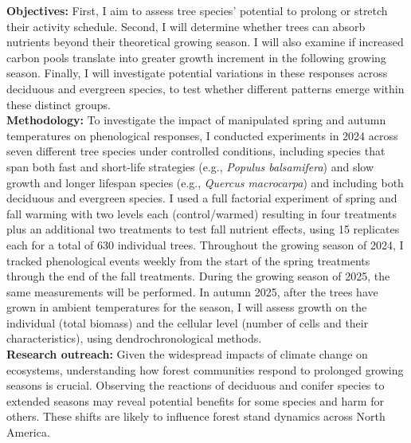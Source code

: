 \documentclass{article}
\begin{document}
\textbf {Objectives:} First, I aim to assess tree species' potential to prolong or stretch their activity schedule. Second, I will determine whether trees can absorb nutrients beyond their theoretical growing season. I will also examine if increased carbon pools translate into greater growth increment in the following growing season. Finally, I will investigate potential variations in these responses across deciduous and evergreen species, to test whether different patterns emerge within these distinct groups.\\ %
\textbf {Methodology:} To investigate the impact of manipulated spring and autumn temperatures on phenological responses, I conducted experiments in 2024 across seven different tree species under controlled conditions, including species that span both fast and short-life strategies (e.g., \emph{Populus balsamifera}) and slow growth and longer lifespan species (e.g., \emph{Quercus macrocarpa}) and including both deciduous and evergreen species.\citep{jonsson_annual_2010} I used a full factorial experiment of spring and fall warming with two levels each (control/warmed) resulting in four treatments plus an additional two treatments to test fall nutrient effects, using 15 replicates each for a total of 630 individual trees. %
Throughout the growing season of 2024, I tracked phenological events weekly from the start of the spring treatments through the end of the fall treatments. During the growing season of 2025, the same measurements will be performed. In autumn 2025, after the trees have grown in ambient temperatures for the season, I will assess growth on the individual (total biomass) and the cellular level (number of cells and their characteristics), using dendrochronological methods.\\
\textbf{Research outreach:} Given the widespread impacts of climate change on ecosystems, understanding how forest communities respond to prolonged growing seasons is crucial. Observing the reactions of deciduous and conifer species to extended seasons may reveal potential benefits for some species and harm for others. These shifts are likely to influence forest stand dynamics across North America.


\end{document}
